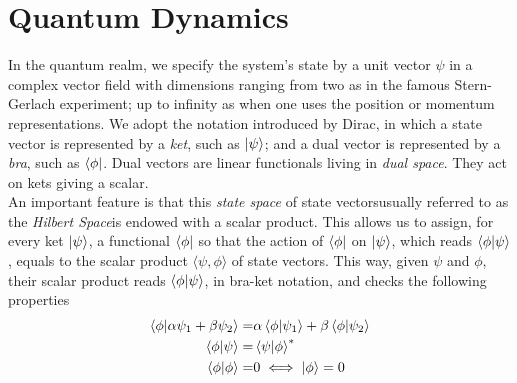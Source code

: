 \section{Quantum Dynamics}
In the quantum realm, we specify the system's state by a unit vector $\psi$ in a complex vector field with dimensions ranging from two \textemdash as in the famous Stern-Gerlach experiment; up to infinity \textemdash as when one uses the position or momentum representations. We adopt the notation introduced by Dirac, in which a state vector is represented by a \textit{ket}, such as $\ket{\psi}$; and a dual vector is represented by a \textit{bra}, such as $\bra{\phi}$.
Dual vectors are linear functionals living in \textit{dual space}. They act on kets giving a scalar.\\

An important feature is that this \textit{state space} of state vectors\textemdash usually referred to as the \textit{Hilbert Space}\textemdash is endowed with a scalar product. This allows us to assign, for every ket $\ket{\psi}$, a functional $\bra{\phi}$ so that the action of $\bra{\phi}$ on $\ket{\psi}$, which reads $\braket{\phi}{\psi}$, equals to the scalar product $\langle\psi,\phi\rangle$ of state vectors. This way, given $\psi$ and $\phi$, their scalar product  reads $\braket{\phi}{\psi}$, in bra-ket notation, and checks the following properties
\begin{equation}
    \begin{split}
        \braket{\phi}{\alpha\psi_1+\beta\psi_2}= &\alpha\braket{\phi}{\psi_1}+\beta\braket{\phi}{\psi_2}\\
        \braket{\phi}{\psi}= &\braket{\psi}{\phi}^*\\
        \braket{\phi}{\phi}= & 0 \iff \ket{\phi} = 0
    \end{split}
\end{equation}


